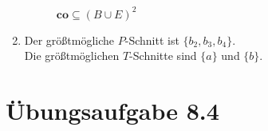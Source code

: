 \documentclass[a4paper]{scrartcl}
\begin{document}
\begin{enumerate}
\begin{figure}[h]
            \caption{$\textbf{co} \subseteq (B \cup E)^2$}
            \label{fig:rel4}
        \end{figure}
        

    \item
        Der größtmögliche $P$-Schnitt ist $\{ b_2, b_3, b_4 \}$. \\
        Die größtmöglichen $T$-Schnitte sind $\{ a \}$ und $\{ b \}$.

\end{enumerate}

\section*{Übungsaufgabe 8.4} 
\end{document}
